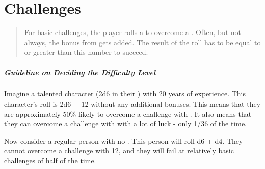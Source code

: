 \documentclass{LegrandOrangeTufteBook}
\begin{document}
\chapterspaceabove{6.75cm}
\chapterspacebelow{11.25cm}


\chapter*{Challenges}

\begin{quote}
	For basic challenges, the player rolls a  to overcome a .
	Often, but not always, the bonus from  gets added.
	The result of the roll has to be equal to or greater than this number to succeed.
\end{quote}

\paragraph*{Guideline on Deciding the Difficulty Level}

Imagine a talented character (2d6 in their ) with 20 years of experience.
This character's roll is 2d6 + 12 without any additional bonuses.
This means that they are approximately 50\% likely to overcome a challenge with .
It also means that they can overcome a challenge with  with a lot of luck - only 1/36 of the time.\\

\marginpar{
	\footnotesize
	
}

Now consider a regular person with no . This person will roll d6 + d4.
They cannot overcome a challenge with 12,
and they will fail at relatively basic challenges of  half of the time.\\
\end{document}
